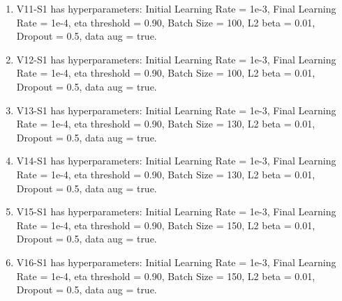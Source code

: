 \documentclass[12pt,reqno]{amsart}
\numberwithin{equation}{section}
\begin{document}
\begin{enumerate}
\item V11-S1 has hyperparameters:  Initial Learning Rate = 1e-3, Final Learning Rate = 1e-4, eta threshold = 0.90, Batch Size = 100, L2 beta = 0.01, Dropout = 0.5, data aug = true. 

\item V12-S1 has hyperparameters:  Initial Learning Rate = 1e-3, Final Learning Rate = 1e-4, eta threshold = 0.90, Batch Size = 100, L2 beta = 0.01, Dropout = 0.5, data aug = true. 

\item V13-S1 has hyperparameters:  Initial Learning Rate = 1e-3, Final Learning Rate = 1e-4, eta threshold = 0.90, Batch Size = 130, L2 beta = 0.01, Dropout = 0.5, data aug = true. 

\item V14-S1 has hyperparameters:  Initial Learning Rate = 1e-3, Final Learning Rate = 1e-4, eta threshold = 0.90, Batch Size = 130, L2 beta = 0.01, Dropout = 0.5, data aug = true. 

\item V15-S1 has hyperparameters:  Initial Learning Rate = 1e-3, Final Learning Rate = 1e-4, eta threshold = 0.90, Batch Size = 150, L2 beta = 0.01, Dropout = 0.5, data aug = true. 

\item V16-S1 has hyperparameters:  Initial Learning Rate = 1e-3, Final Learning Rate = 1e-4, eta threshold = 0.90, Batch Size = 150, L2 beta = 0.01, Dropout = 0.5, data aug = true. 

\end{enumerate}
\end{document}

